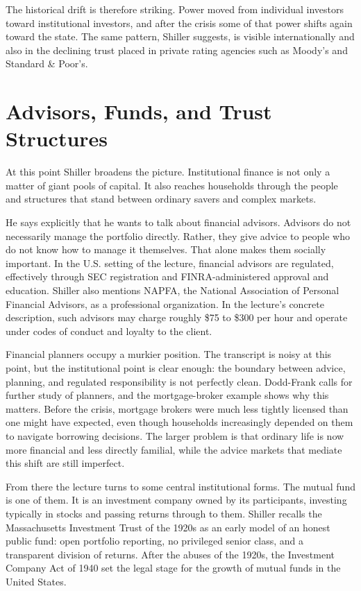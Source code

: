 The historical drift is therefore striking. Power moved from individual investors toward institutional investors, and after the crisis some of that power shifts again toward the state. The same pattern, Shiller suggests, is visible internationally and also in the declining trust placed in private rating agencies such as Moody's and Standard \& Poor's.

\section{Advisors, Funds, and Trust Structures}

At this point Shiller broadens the picture. Institutional finance is not only a matter of giant pools of capital. It also reaches households through the people and structures that stand between ordinary savers and complex markets.

He says explicitly that he wants to talk about financial advisors. Advisors do not necessarily manage the portfolio directly. Rather, they give advice to people who do not know how to manage it themselves. That alone makes them socially important. In the U.S. setting of the lecture, financial advisors are regulated, effectively through SEC registration and FINRA-administered approval and education. Shiller also mentions NAPFA, the National Association of Personal Financial Advisors, as a professional organization. In the lecture's concrete description, such advisors may charge roughly \$75 to \$300 per hour and operate under codes of conduct and loyalty to the client.

Financial planners occupy a murkier position. The transcript is noisy at this point, but the institutional point is clear enough: the boundary between advice, planning, and regulated responsibility is not perfectly clean. Dodd-Frank calls for further study of planners, and the mortgage-broker example shows why this matters. Before the crisis, mortgage brokers were much less tightly licensed than one might have expected, even though households increasingly depended on them to navigate borrowing decisions. The larger problem is that ordinary life is now more financial and less directly familial, while the advice markets that mediate this shift are still imperfect.

From there the lecture turns to some central institutional forms. The mutual fund is one of them. It is an investment company owned by its participants, investing typically in stocks and passing returns through to them. Shiller recalls the Massachusetts Investment Trust of the 1920s as an early model of an honest public fund: open portfolio reporting, no privileged senior class, and a transparent division of returns. After the abuses of the 1920s, the Investment Company Act of 1940 set the legal stage for the growth of mutual funds in the United States.

